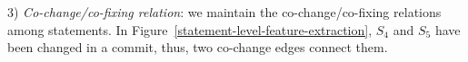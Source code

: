 
3) {\em Co-change/co-fixing relation}: we maintain the
co-change/co-fixing relations among statements. In
Figure~\ref{statement-level-feature-extraction}, $S_4$ and
$S_5$ have been changed in a commit, thus, two co-change
edges connect them.



